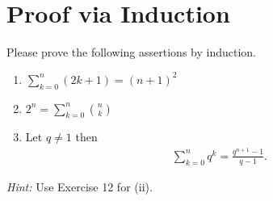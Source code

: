 \section{Proof via Induction}
Please prove the following assertions by induction.
\begin{enumerate}
	\item $\sum_{k=0}^{n} (2k+1) = (n+1)^2$
	\item $2^n = \sum_{k=0}^n \binom{n}{k}$
	\item Let $q \neq 1$ then
	\begin{align*}
	\sum_{k=0}^{n} q^k = \frac{q^{n+1} - 1}{q -1}.
	\end{align*}
\end{enumerate}
\textit{Hint:} Use Exercise 12 for (ii).